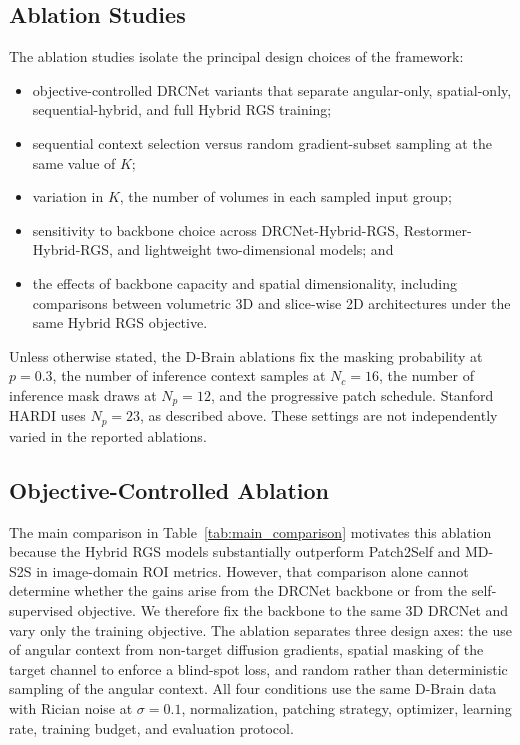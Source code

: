 \documentclass[preprint,12pt]{elsarticle}
\begin{document}
\subsection{Ablation Studies}
The ablation studies isolate the principal design choices of the framework:
\begin{itemize}
  \item objective-controlled DRCNet variants that separate angular-only, spatial-only, sequential-hybrid, and full Hybrid RGS training;
  \item sequential context selection versus random gradient-subset sampling at the same value of $K$;
  \item variation in $K$, the number of volumes in each sampled input group;
  \item sensitivity to backbone choice across DRCNet-Hybrid-RGS, Restormer-Hybrid-RGS, and lightweight two-dimensional models; and
  \item the effects of backbone capacity and spatial dimensionality, including comparisons between volumetric 3D and slice-wise 2D architectures under the same Hybrid RGS objective.
\end{itemize}
Unless otherwise stated, the D-Brain ablations fix the masking probability at $p=0.3$, the number of inference context samples at $N_c=16$, the number of inference mask draws at $N_p=12$, and the progressive patch schedule. Stanford HARDI uses $N_p=23$, as described above. These settings are not independently varied in the reported ablations.

\subsection{Objective-Controlled Ablation}
The main comparison in Table~\ref{tab:main_comparison} motivates this ablation because the Hybrid RGS models substantially outperform Patch2Self and MD-S2S in image-domain ROI metrics. However, that comparison alone cannot determine whether the gains arise from the DRCNet backbone or from the self-supervised objective. We therefore fix the backbone to the same 3D DRCNet and vary only the training objective. The ablation separates three design axes: the use of angular context from non-target diffusion gradients, spatial masking of the target channel to enforce a blind-spot loss, and random rather than deterministic sampling of the angular context. All four conditions use the same D-Brain data with Rician noise at $\sigma=0.1$, normalization, patching strategy, optimizer, learning rate, training budget, and evaluation protocol.
\end{document}
